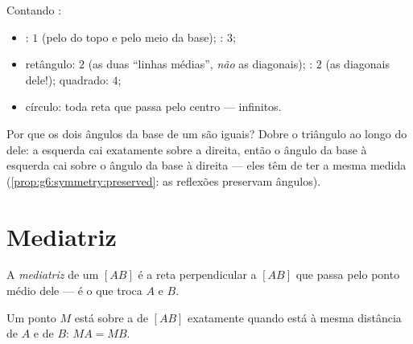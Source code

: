 \begin{example}\label{ex:g6:symmetry:shapes}
Contando :
\begin{itemize}
  \item {}: $1$ (pelo  do topo e pelo meio da
        base); : $3$;
  \item retângulo: $2$ (as duas ``linhas médias'', \emph{não} as
        diagonais); : $2$ (as diagonais dele!); quadrado: $4$;
  \item círculo: toda reta que passa pelo centro --- infinitos.
\end{itemize}
\end{example}

\begin{example}\label{ex:g6:symmetry:proves}
Por que os dois ângulos da base de um  são iguais?
Dobre o triângulo ao longo do  dele: a  esquerda
cai exatamente sobre a direita, então o ângulo da base à esquerda cai
sobre o ângulo da base à direita --- eles têm de ter a mesma medida
(\cref{prop:g6:symmetry:preserved}: as reflexões preservam ângulos).
\end{example}

\section{Mediatriz}

\begin{definition}[Mediatriz]\label{def:g6:symmetry:bisector}
A \emph{mediatriz} de um  $[AB]$ é a reta
perpendicular a $[AB]$ que passa pelo ponto médio dele --- é o  que troca $A$ e $B$.
\end{definition}

\begin{proposition}[Equidistância]\label{prop:g6:symmetry:bisector}
Um ponto $M$ está sobre a  de $[AB]$ exatamente quando está à
mesma distância de $A$ e de $B$: $MA = MB$.
\end{proposition}
\admitted

